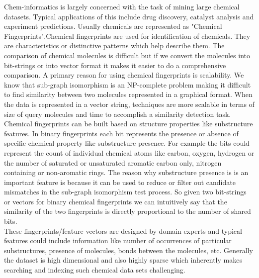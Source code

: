 
%
%

Chem-informatics is largely concerned with the task of mining large chemical datasets. Typical applications of this include drug discovery, catalyst analysis and experiment predictions. Usually chemicals are represented as "Chemical Fingerprints".Chemical fingerprints are used for identification of chemicals. They are characteristics or distinctive patterns which help describe them. The comparison of chemical molecules is difficult but if we convert the molecules into bit-strings or into vector format it makes it easier to do a comprehensive comparison. A primary reason for using chemical fingerprints is scalability. We know that sub-graph isomorphism is an NP-complete problem making it difficult to find similarity between two molecules represented in a graphical format. When the data is represented in a vector string, techniques are more scalable in terms of size of query molecules and time to accomplish a similarity detection task.\\

Chemical fingerprints can be built based on structure properties like substructure features. In binary fingerprints each bit represents the presence or absence of specific chemical property like substructure presence. For example the bits could represent the count of individual chemical atoms like carbon, oxygen, hydrogen or the number of saturated or unsaturated aromatic carbon only, nitrogen containing or non-aromatic rings. The reason why substructure presence is is an important feature is because it can be used to reduce or filter out candidate mismatches in the sub-graph isomorphism test process. So given two bit-strings or vectors for binary chemical  fingerprints we can intuitively say that the similarity of the two fingerprints is directly proportional to the number of shared bits. \\

	These fingerprints/feature vectors are designed by domain experts and typical features could include information like number of occurrences of particular substructures, presence of molecules, bonds between the molecules, etc. Generally the dataset is high dimensional and also highly sparse which inherently makes searching and indexing such chemical data sets challenging. \\
	
